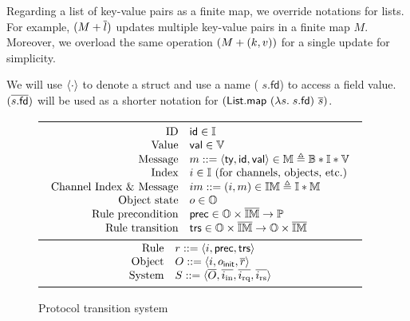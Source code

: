 Regarding a list of key-value pairs as a finite map, we override notations for lists.
For example, $(M + \overline{l})$ updates multiple key-value pairs in a finite map $M$.
Moreover, we overload the same operation $(M + (k, v))$ for a single update for simplicity.

We will use $\langle \cdot \rangle$ to denote a struct and use a name (\eg{} $s.\textsf{fd}$) to access a field value.
$(\overline{s.\textsf{fd}})$ will be used as a shorter notation for $(\textsf{List.map}\ (\lambda s.\; s.\textsf{fd})\ \listof{s})$.

\begin{figure}[t]
  \centering
  \begin{tabular}{|c|}
    \hline
    \begin{math}
      \begin{array}{rl}
        \textrm{ID} & \textsf{id}{} \in \mathbb{I}{} \\
        \textrm{Value} & \textsf{val}{} \in \mathbb{V}{} \\
        \textrm{Message} & m ::= \langle \textsf{ty}, \textsf{id}, \textsf{val} \rangle \in \mathbb{M}{} \triangleq \mathbb{B} \ast \mathbb{I} \ast \mathbb{V} \\
        \textrm{Index} & i \in \mathbb{I}{}\ \textrm{(for channels, objects, etc.)} \\
        \textrm{Channel Index \& Message} & im ::= (i, m) \in \mathbb{IM} \triangleq \mathbb{I} \ast \mathbb{M} \\
        \textrm{Object state} & o \in \mathbb{O}{} \\
        \textrm{Rule precondition} & \textsf{prec}{} \in \mathbb{O} \times \overline{\mathbb{IM}} \to \mathbb{P} \\
        \textrm{Rule transition} & \textsf{trs}{} \in \mathbb{O} \times \overline{\mathbb{IM}} \to \mathbb{O} \times \overline{\mathbb{IM}}\\
      \end{array}
    \end{math}\\
    \hline
    \begin{math}
      \begin{array}{rl}
        \textrm{Rule} & r ::= \langle i, \textsf{prec}{}, \textsf{trs}{} \rangle \\
        \textrm{Object} & O ::= \langle i, o_{\textsf{init}}, \overline{r} \rangle \\
        \textrm{System} & S ::= \langle \overline{O}, \overline{i_{\textrm{in}}}, \overline{i_{\textrm{rq}}}, \overline{i_{\textrm{rs}}} \rangle \\
      \end{array}
    \end{math}\\
    \hline
  \end{tabular}
  \caption{Protocol transition system}
  \label{fig-trs-system}
\end{figure}

